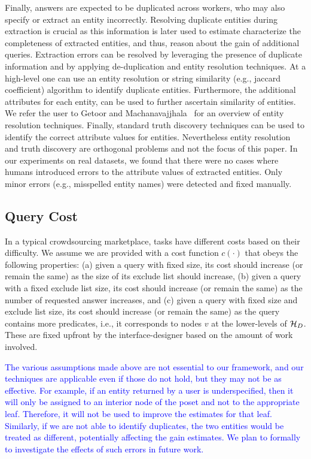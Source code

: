 \iftr
Finally, answers are expected to be duplicated across workers, who may also specify or extract an entity incorrectly. Resolving duplicate entities during extraction is crucial as this information is later used to estimate characterize the completeness of extracted entities, and thus, reason about the gain of additional queries.  Extraction errors can be resolved by leveraging the presence of duplicate information and by applying de-duplication and entity resolution techniques. At a high-level one can use an entity resolution or string similarity (e.g., jaccard coefficient) algorithm to identify duplicate entities. Furthermore, the additional attributes for each entity, can be used to further ascertain similarity of entities. We refer the user to Getoor and Machanavajjhala~\cite{getoor:kdd13} for an overview of entity resolution techniques. Finally, standard truth discovery techniques can be used to identify the correct attribute values for entities. Nevertheless entity resolution and truth discovery are orthogonal problems and not the focus of this paper. In our experiments on real datasets, we found that there were no cases where humans introduced errors to the attribute values of extracted entities. Only minor errors (e.g., misspelled entity names) were detected and fixed manually. \fi

\subsection{Query Cost} 
In a typical crowdsourcing marketplace, tasks have different costs based on their difficulty. We assume we are provided with a cost function $c(\cdot)$ that obeys the following properties:  (a) given a query with fixed size, its cost should increase (or remain the same) as the size of its exclude list should increase, (b) given a query with a fixed exclude list size, its cost should increase (or remain the same) as the number of requested answer increases, and (c) given a query with fixed size and exclude list size, its cost should increase (or remain the same) as the query contains more predicates, i.e., it corresponds to nodes $v$ at the lower-levels of $\mathcal{H}_D$. These are fixed upfront by the interface-designer based on the amount of work involved.

\textcolor{blue}{ The various assumptions made above are not essential to our framework, and our techniques are applicable even if those do not hold, but they may not be as effective. For example, if an entity returned by a user is underspecified, then it will only be assigned to an interior node of the poset and not to the appropriate leaf. Therefore, it will not be used to improve the estimates for that leaf. Similarly, if we are not able to identify duplicates, the two entities would be treated as different, potentially affecting the gain estimates. We plan to formally to investigate the effects of such errors in future work.}